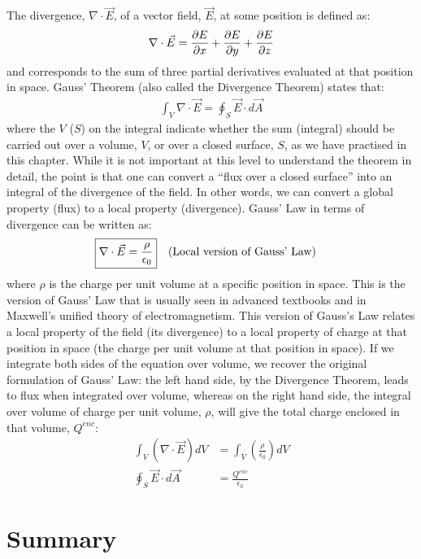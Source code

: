 The divergence, $\nabla \cdot \vec E$, of a vector field, $\vec E$, at some position is defined as:
\begin{align*}
\nabla \cdot \vec E=\frac{\partial E}{\partial x}+\frac{\partial E}{\partial y}+\frac{\partial E}{\partial z}
\end{align*}
and corresponds to the sum of three partial derivatives evaluated at that position in space. Gauss' Theorem (also called the Divergence Theorem) states that:
\begin{align*}
\int_V \nabla \cdot \vec E = \oint_S \vec E \cdot d\vec A
\end{align*}
where the $V$ ($S$) on the integral indicate whether the sum (integral) should be carried out over a volume, $V$, or over a closed surface, $S$, as we have practised in this chapter. While it is not important at this level to understand the theorem in detail, the point is that one can convert a ``flux over a closed surface'' into an integral of the divergence of the field. In other words, we can convert a global property (flux) to a local property (divergence). Gauss' Law in terms of divergence can be written as:
\begin{align*}
\Aboxed{\nabla \cdot \vec E &= \frac{\rho}{\epsilon_0}}\quad \text{(Local version of Gauss' Law)}
\end{align*}
where $\rho$ is the charge per unit volume at a specific position in space. This is the version of Gauss' Law that is usually seen in advanced textbooks and in Maxwell's unified theory of electromagnetism. This version of Gauss's Law relates a local property of the field (its divergence) to a local property of charge at that position in space (the charge per unit volume at that position in space). If we integrate both sides of the equation over volume, we recover the original formulation of Gauss' Law: the left hand side, by the Divergence Theorem, leads to flux when integrated over volume, whereas on the right hand side, the integral over volume of charge per unit volume, $\rho$, will give the total charge enclosed in that volume, $Q^{enc}$:
\begin{align*}
\int_V  \left(\nabla \cdot \vec E \right)dV&= \int_V \left(\frac{\rho}{\epsilon_0}\right) dV\\
\oint_S \vec E \cdot d\vec A &=\frac{Q^{enc}}{\epsilon_0}
\end{align*}

\newpage
\section{Summary}

